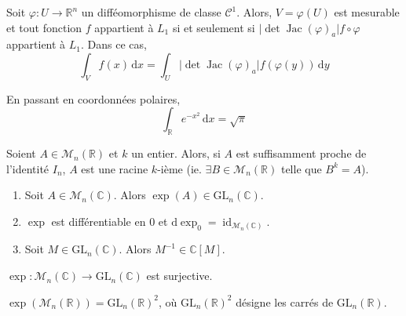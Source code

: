 
	\begin{application}
		Soit $\varphi : U \rightarrow \mathbb{R}^n$ un difféomorphisme de classe $\mathcal{C}^1$. Alors, $V = \varphi(U)$ est mesurable et tout fonction $f$ appartient à $L_1$ si et seulement si $\vert \det \operatorname{Jac}(\varphi)_a \vert f \circ \varphi$ appartient à $L_1$. Dans ce cas,
		\[ \int_V f(x) \, \mathrm{d}x = \int_U \vert \det \operatorname{Jac}(\varphi)_a \vert f (\varphi(y)) \, \mathrm{d}y \]
	\end{application}


	\begin{example}
		En passant en coordonnées polaires,
		\[ \int_{\mathbb{R}} e^{-x^2} \, \mathrm{d}x = \sqrt{\pi} \]
	\end{example}


	\begin{application}
		Soient $A \in \mathcal{M}_n(\mathbb{R})$ et $k$ un entier. Alors, si $A$ est suffisamment proche de l'identité $I_n$, $A$ est une racine $k$-ième (ie. $\exists B \in \mathcal{M}_n(\mathbb{R})$ telle que $B^k = A$).
	\end{application}


	\begin{lemma}
		\begin{enumerate}[label=(\roman*)]
			\item Soit $A \in \mathcal{M}_n(\mathbb{C})$. Alors $\exp(A) \in \mathrm{GL}_n(\mathbb{C})$.
			\item $\exp$ est différentiable en $0$ et $\mathrm{d}\exp_0 = \operatorname{id}_{\mathcal{M}_n(\mathbb{C})}$.
			\item Soit $M \in \mathrm{GL}_n(\mathbb{C})$. Alors $M^{-1} \in \mathbb{C}[M]$.
		\end{enumerate}
	\end{lemma}


	\begin{theorem}
		$\exp : \mathcal{M}_n(\mathbb{C}) \rightarrow \mathrm{GL}_n(\mathbb{C})$ est surjective.
	\end{theorem}

	\begin{application}
		$\exp(\mathcal{M}_n(\mathbb{R})) = \mathrm{GL}_n(\mathbb{R})^2$, où $\mathrm{GL}_n(\mathbb{R})^2$ désigne les carrés de $\mathrm{GL}_n(\mathbb{R})$.
	\end{application}

